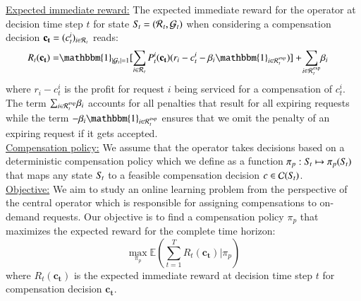 \noindent \underline{Expected immediate reward:} 
The expected immediate reward for the operator at decision time step $t$ for state $S\hspace{-0.1em}_t = (\mathcal{R}\hspace{0.05em}_{t},\mathcal{G}_t)$ when considering a compensation decision $\mathbf{c_t} = (c^i_t)_{i \in \mathcal{R}\hspace{0.05em}_{t}}$ reads:
\begin{align}
R_t(\mathbf{c_t}) = & \mathbbm{1}_{|\mathcal{G}_t|=1} [\sum_{i \in \mathcal{R}\hspace{0.05em}_{t}}{P^i_{t}(\mathbf{c_t})(r_i - c_t^i - \beta_i \mathbbm{1}_{i \in \mathcal{R}\hspace{0.05em}_t^{\mathrm{exp}}}}) ] + \! \sum_{i \in \mathcal{R}\hspace{0.05em}_t^{\mathrm{exp}}}\!\beta_i
\label{eq:imm_rew}
\end{align}
\noindent where $r_i - c_t^i$ is the profit for request $i$ being serviced for a compensation of $c_t^i$. The term $\sum_{i \in \mathcal{R}\hspace{0.05em}_t^{\mathrm{exp}}}\!\beta_i$ accounts for all penalties that result for all expiring requests while the term $- \beta_i \mathbbm{1}_{i \in \mathcal{R}\hspace{0.05em}_t^{\mathrm{exp}}}$ ensures that we omit the penalty of an expiring request if it gets accepted. \\
\noindent \underline{Compensation policy:} 
We assume that the operator takes decisions based on a deterministic compensation policy which we define as a function $\pi_p: S\hspace{-0.1em}_t \mapsto \pi_p(S\hspace{-0.1em}_t)$ that maps any state $S\hspace{-0.1em}_t$ to a feasible compensation decision $c \in \mathcal{C}(S\hspace{-0.1em}_t)$. \\
\noindent \underline{Objective:} 
We aim to study an online learning problem from the perspective of the central operator which is responsible for assigning compensations to on-demand requests. Our objective is to find a compensation policy $\pi_p$ that maximizes the expected reward for the complete time horizon:
\begin{equation}
  \max_{\pi_p}\mathbb{E}\left(\sum_{t=1}^{T}{R_t(\mathbf{c_t})}|\pi_p\right)
\end{equation} where $R_t(\mathbf{c_t})$ is the expected immediate reward at decision time step $t$ for compensation decision $\mathbf{c_t}$.

